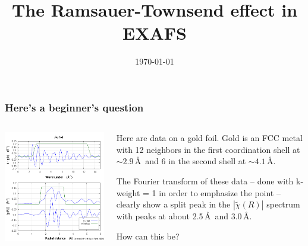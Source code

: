 \documentclass[10pt, xcolor=x11names, compress]{beamer}
\title{The Ramsauer-Townsend effect in EXAFS}
\date{\today}
\begin{document}
\maketitle


\begin{frame}
  \frametitle{Here's a beginner's question}

  \begin{columns}[T]
    \begin{column}{0.5\linewidth}
      \includegraphics[width=\linewidth]{Au_rk.png}
    \end{column}
    \begin{column}{0.5\linewidth}
      Here are data on a gold foil.  Gold is an FCC metal with 12
      neighbors in the first coordination shell at $\sim2.9$\,\AA\
      and 6 in the second shell at $\sim4.1$\,\AA.

      \bigskip

      The Fourier transform of these data -- done with k-weight = 1 in
      order to emphasize the point -- clearly show a split peak in the
      $|\tilde\chi(R)|$ spectrum with peaks at about 2.5\,\AA\ and
      3.0\,\AA.

      \bigskip

      \begin{alertblock}{}
        \centering How can this be?
      \end{alertblock}
    \end{column}
  \end{columns}
\end{frame}
\end{document}
